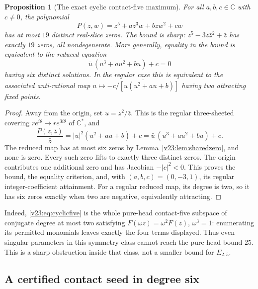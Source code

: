 \documentclass[UTF8,11pt]{ctexart}
\newtheorem{prop}[thm]{Proposition}
\theoremstyle{definition}
\numberwithin{equation}{section}
\newcommand{\C}{\mathbb C}\newcommand{\R}{\mathbb R}
\begin{document}
\begin{prop}[The exact cyclic contact-five maximum]
\label{v23:prop:cyclicfive}
For all $a,b,c\in\C$ with $c\ne0$, the polynomial
\begin{equation}\label{v23:eq:cyclicfive}
             P(z,w)=z^5+a z^3w+bzw^2+cw
\end{equation}
has at most $19$ distinct real-slice zeros. The bound is sharp:
$z^5-3z\bar z^2+\bar z$ has exactly $19$ zeros, all
nondegenerate. More generally, equality in the bound is
equivalent to the reduced equation
\[
          \bar u\,(u^3+a u^2+b u)+c=0
\]
having six distinct solutions. In the regular case this is
equivalent to the associated anti-rational map
$u\mapsto\overline{-c/[u(u^2+au+b)]}$ having two attracting
fixed points.
\end{prop}
\begin{proof}
Away from the origin, set $u=z^2/\bar z$.
This is the regular three-sheeted covering
$re^{i\theta}\mapsto re^{3i\theta}$ of $\C^*$, and
\[
 \frac{P(z,\bar z)}{\bar z}
   =|u|^2(u^2+au+b)+c
   =\bar u\,(u^3+au^2+bu)+c.
\]
The reduced map has at most six zeros by
Lemma~\ref{v23:lem:sharedzero}, and none is zero. Every such
zero lifts to exactly three distinct zeros. The origin contributes
one additional zero and has Jacobian $-|c|^2<0$.
This proves the bound, the equality criterion, and, with
$(a,b,c)=(0,-3,1)$, its regular integer-coefficient attainment.
For a regular reduced map, its degree is two, so it has six
zeros exactly when two are negative, equivalently attracting.
\end{proof}

Indeed, \eqref{v23:eq:cyclicfive} is the whole pure-head
contact-five subspace of conjugate degree at most two satisfying
$F(\omega z)=\omega^2F(z)$, $\omega^3=1$:
enumerating its permitted monomials leaves exactly the four terms
displayed. Thus even singular parameters in this symmetry class
cannot reach the pure-head bound $25$. This is a sharp obstruction
inside that class, not a smaller bound for $E_{2,5}$.


\subsection{A certified contact seed in degree six}
\label{v22:sec:contact26}
\end{document}
